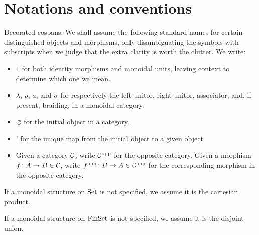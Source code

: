 \chapter*{Notations and conventions}

Decorated cospans: 
We shall assume the following standard names for certain distinguished objects
and morphisms, only disambiguating the symbols with subscripts when we judge
that the extra clarity is worth the clutter. We write: 
\begin{itemize} 
  \item $1$ for both identity morphisms and monoidal units, leaving context to
    determine which one we mean.
  \item $\lambda$, $\rho$, $a$, and $\sigma$ for respectively the left unitor, right unitor,
    associator, and, if present, braiding, in a monoidal category.
  \item $\varnothing$ for the initial object in a category.
  \item $!$ for the unique map from the initial object to a given object.
  \item Given a category $\mathcal C$, write $\mathcal C^{\mathrm{opp}}$ for the opposite category.
    Given a morphism $f{\colon} A \to B \in \mathcal C$, write $f^{\mathrm{opp}}{\colon} B \to A \in
    \mathcal C^{\mathrm{opp}}$ for the corresponding morphism in the opposite category.
\end{itemize}

If a monoidal structure on $\mathrm{Set}$ is not specified, we assume it is the
cartesian product. 

If a monoidal structure on $\mathrm{FinSet}$ is not specified, we assume it is the
disjoint union. 

